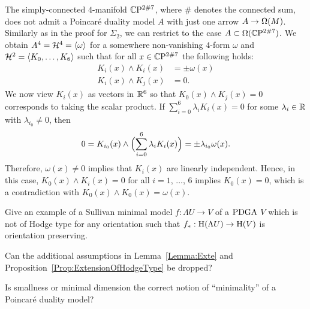 \documentclass[\MainFolder/Text.tex]{subfiles}
\begin{document}
\begin{Example}
\begin{ExampleList}
\item  The simply-connected $4$-manifold $\mathbb{C}\mathrm{P}^{2\# 7}$, where $\#$ denotes the connected sum, does not admit a Poincar\'e duality model $A$ with just one arrow $A \rightarrow \Omega(M)$. Similarly as in the proof for $\Sigma_2$, we can restrict to the case $A\subset\Omega(\mathbb{C}\mathrm{P}^{2 \# 7})$. We obtain $A^4 = \mathcal{H}^4 = \langle \omega \rangle$ for a somewhere non-vanishing $4$-form $\omega$ and $\mathcal{H}^2 = \langle K_0, \dotsc, K_6 \rangle$ such that for all $x\in \mathbb{C}\mathrm{P}^{2\#7}$ the following holds:
\begin{align*}
	K_i(x)\wedge K_i(x) &= \pm \omega(x) \\
	K_i(x) \wedge K_j(x) &= 0.
\end{align*}
We now view $K_i(x)$ as vectors in $\mathbb{R}^6$ so that $K_0(x)\wedge K_j(x) = 0$ corresponds to taking the scalar product. If $\sum_{i=0}^6 \lambda_i K_i(x) = 0$ for some $\lambda_i\in \mathbb{R}$ with $\lambda_{i_0} \neq 0$, then
\[
0 = K_{i_0}(x) \wedge \Bigl(\sum_{i=0}^6 \lambda_i K_i(x)\Bigr) = \pm \lambda_{i_0} \omega(x).
\]
Therefore, $\omega(x) \neq 0$ implies that $K_i(x)$ are linearly independent. Hence, in this case, $K_0(x) \wedge K_i(x) = 0$ for all $i=1$, $\dotsc$, $6$ implies $K_0(x) = 0$, which is a contradiction with $K_0(x) \wedge K_0(x) = \omega(x)$.\qedhere
\end{ExampleList}
\end{Example}


\begin{Questions}\label{Q:QuestionsPonc}
\begin{RemarkList}
\item Give an example of a Sullivan minimal model $f: \Lambda U \rightarrow V$ of a $\mathrm{PDGA}$ $V$ which is not of Hodge type for any orientation such that $f_*: \mathrm{H}(\Lambda U) \rightarrow \mathrm{H}(V)$ is orientation preserving.
\item Can the additional assumptions in Lemma~\ref{Lemma:Exte} and Proposition~\ref{Prop:ExtensionOfHodgeType} be dropped?
\item Is smallness or minimal dimension the correct notion of ``minimality'' of a Poincar\'e duality model?  \qedhere
\end{RemarkList}
\end{Questions}
\end{document}
